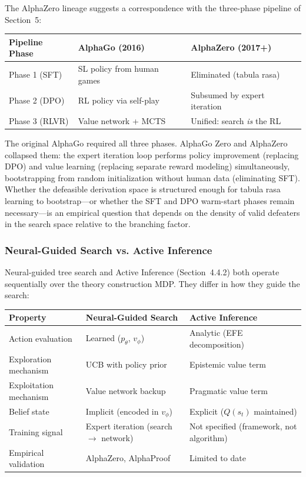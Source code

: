 \documentclass{article}
\begin{document}
The AlphaZero lineage suggests a correspondence with the three-phase pipeline of Section~5:

\begin{center}
\small
\begin{tabular}{@{}lll@{}}
\toprule
Pipeline Phase & AlphaGo (2016) & AlphaZero (2017+) \\
\midrule
Phase 1 (SFT) & SL policy from human games & Eliminated (tabula rasa) \\
Phase 2 (DPO) & RL policy via self-play & Subsumed by expert iteration \\
Phase 3 (RLVR) & Value network + MCTS & Unified: search \emph{is} the RL \\
\bottomrule
\end{tabular}
\end{center}

The original AlphaGo required all three phases. AlphaGo Zero and AlphaZero collapsed them: the expert iteration loop performs policy improvement (replacing DPO) and value learning (replacing separate reward modeling) simultaneously, bootstrapping from random initialization without human data (eliminating SFT). Whether the defeasible derivation space is structured enough for tabula rasa learning to bootstrap---or whether the SFT and DPO warm-start phases remain necessary---is an empirical question that depends on the density of valid defeaters in the search space relative to the branching factor.

\subsubsection{Neural-Guided Search vs. Active Inference}

Neural-guided tree search and Active Inference (Section~4.4.2) both operate sequentially over the theory construction MDP. They differ in how they guide the search:

\begin{center}
\small
\begin{tabular}{@{}lll@{}}
\toprule
Property & Neural-Guided Search & Active Inference \\
\midrule
Action evaluation & Learned ($p_\theta$, $v_\phi$) & Analytic (EFE decomposition) \\
Exploration mechanism & UCB with policy prior & Epistemic value term \\
Exploitation mechanism & Value network backup & Pragmatic value term \\
Belief state & Implicit (encoded in $v_\phi$) & Explicit ($Q(s_t)$ maintained) \\
Training signal & Expert iteration (search $\to$ network) & Not specified (framework, not algorithm) \\
Empirical validation & AlphaZero, AlphaProof & Limited to date \\
\bottomrule
\end{tabular}
\end{center}
\end{document}

